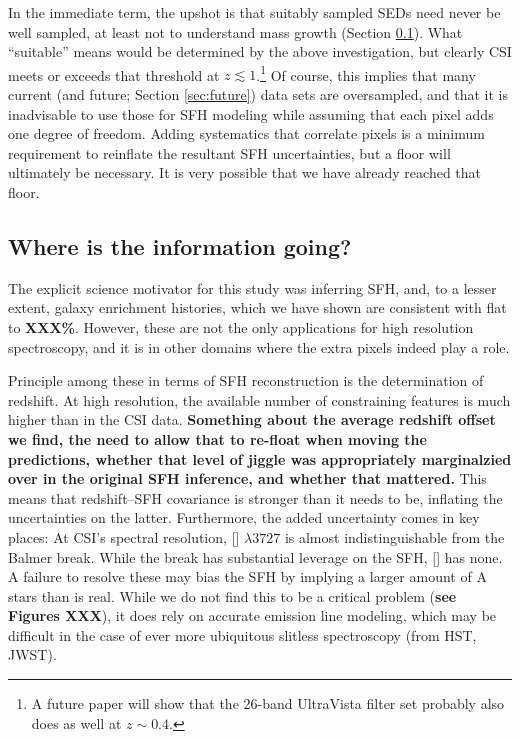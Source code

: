 \documentclass[a4paper,fleqn,usenatbib]{mnras}
\newcommand{\bfr}{\bf\color{red}}
\begin{document}
In the immediate term, the upshot is that suitably sampled SEDs need never be well sampled, at least
not to understand mass growth (Section \ref{sec:redshifts}). What ``suitable'' means would be determined 
by the above investigation, but clearly CSI meets or exceeds that threshold at $z\lesssim1$.\footnote{A future 
paper will show that the 26-band UltraVista filter set \citep{Muzzin13} probably also does as well at 
$z\sim0.4$.} Of course, this implies that many current (and future; Section \ref{sec:future}) data sets 
are oversampled, and that it is inadvisable to use those for SFH modeling while assuming that each 
pixel adds one degree of freedom. Adding systematics that correlate pixels is a minimum requirement 
to reinflate the resultant SFH uncertainties, but a floor will ultimately be necessary. It is very possible 
that we have already reached that floor.

\subsection{Where is the information going?}
\label{sec:redshifts}

The explicit science motivator for this study was inferring SFH, and, to a lesser extent, galaxy 
enrichment histories, which we have shown are consistent with flat to {\bfr XXX\%}. However, 
these are not the only applications for high resolution spectroscopy, and it is in other domains 
where the extra pixels indeed play a role.

Principle among these in terms of SFH reconstruction is the determination of redshift. At high 
resolution, the available number
of constraining features is much higher than in the CSI data. {\bfr Something about the average
redshift offset we find, the need to allow that to re-float when moving the predictions, whether
that level of jiggle was appropriately marginalzied over in the original SFH inference, and whether
that mattered.} This means that redshift--SFH covariance is stronger than it needs to be, inflating 
the uncertainties on the latter. Furthermore, the added uncertainty comes in key places: At CSI's 
spectral resolution, [] $\lambda 3727$ is almost indistinguishable from the Balmer break. 
While the break has substantial leverage on the SFH, [] has none. A failure to resolve these 
may bias the SFH by implying a larger amount of A stars than is real. While we do not find this to 
be a critical problem ({\bfr see Figures XXX}), it does rely on accurate emission line modeling, 
which may be difficult in the case of ever more ubiquitous slitless spectroscopy (from HST, JWST). 
\end{document}

